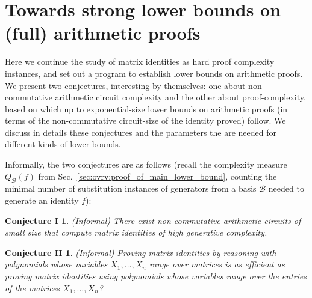 \documentclass[12pt,reqno]{article}
\newcommand\F{\ensuremath{\mathbb F}}
\newcommand{\matd}{{\ensuremath{{\rm Mat}_d(\F)}}}
\begin{document}



%
\section{Towards strong lower bounds on (full) arithmetic proofs}
\label{sec:intro_hard_identities}


Here we continue the study of matrix identities as hard proof complexity instances, and set out a program to establish  lower bounds on arithmetic proofs. We present two conjectures, interesting by themselves: one
about non-commutative arithmetic circuit complexity and the
other about proof-complexity, based on which up to exponential-size lower bounds on arithmetic proofs (in terms of the non-commutative circuit-size of the
identity proved) follow. We discuss in details these
conjectures and the parameters the are needed for different
kinds of lower-bounds.

Informally, the two conjectures are as follows (recall the complexity measure $Q_{\mathcal B}(f)$ from Sec.~\ref{sec:ovrv:proof_of_main_lower_bound}, counting the minimal number of substitution instances of generators from a basis $\mathcal B$ needed to generate an identity $f$):

\newtheorem*{conj_circ_size}{Conjecture I}

\begin{conj_circ_size} (Informal)
There exist non-commutative arithmetic circuits of small size that compute matrix identities of high generative complexity.
\end{conj_circ_size}

\newtheorem*{main_conj}{Conjecture II}
\begin{main_conj} (Informal)
Proving matrix identities by reasoning with polynomials whose variables $X_1,\ldots, X_n$ range over matrices is \emph{as
efficient} as proving matrix identities using polynomials whose variables  range over the \emph{entries} of the matrices $X_1,\ldots, X_n$?
\end{main_conj}
\end{document}
